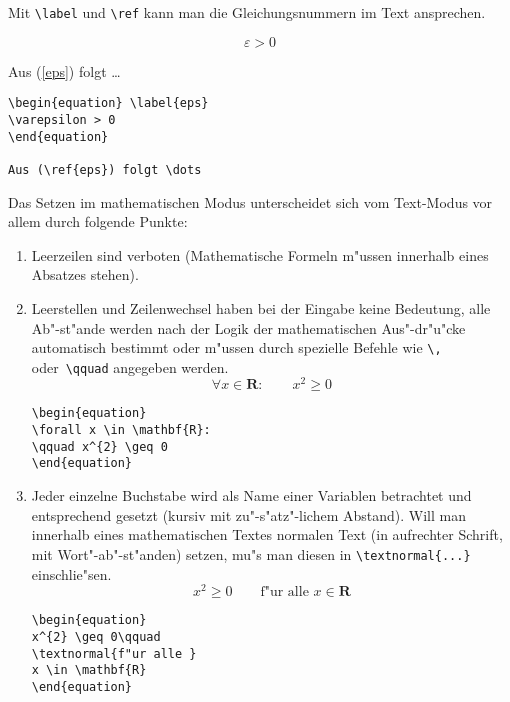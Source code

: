 Mit \verb|\label| und \verb|\ref| kann man die Gleichungsnummern
im Text ansprechen.

\exa
\begin{equation} \label{eps}
\varepsilon > 0
\end{equation}
 
Aus (\ref{eps}) folgt \dots
\exb
\begin{verbatim}
\begin{equation} \label{eps}
\varepsilon > 0
\end{equation}
 
Aus (\ref{eps}) folgt \dots
\end{verbatim}
\exc
 
 
 
Das Setzen im mathematischen Modus unterscheidet sich vom
Text-Modus vor allem durch folgende Punkte:
\begin{enumerate}
\item Leerzeilen sind verboten (Mathematische Formeln m"ussen
  innerhalb eines Absatzes stehen).

\item Leerstellen und Zeilenwechsel haben bei der Eingabe keine
  Bedeutung, alle Ab"-st"ande werden nach der Logik der
  mathematischen Aus"-dr"u"cke automatisch bestimmt oder m"ussen
  durch spezielle Befehle wie \verb|\,| oder~\verb|\qquad|
  angegeben werden.
\exa
\begin{equation}
\forall x \in \mathbf{R}:
\qquad x^{2} \geq 0
\end{equation}
\exb
\begin{verbatim}
\begin{equation}
\forall x \in \mathbf{R}:
\qquad x^{2} \geq 0
\end{equation}
\end{verbatim}
\exc
 
\item Jeder einzelne Buchstabe wird als Name einer Variablen
  betrachtet und entsprechend gesetzt (kursiv mit
  zu"-s"atz"-lichem Abstand).  Will man innerhalb eines
  mathematischen Textes normalen Text (in aufrechter Schrift, mit
  Wort"-ab"-st"anden) setzen, mu"s man diesen in
  \verb|\textnormal{...}| einschlie"sen.
\exa
\begin{equation}
x^{2} \geq 0\qquad
\textrm{f"ur alle }
x \in \mathbf{R}
\end{equation}
\exb
\begin{verbatim}
\begin{equation}
x^{2} \geq 0\qquad
\textnormal{f"ur alle }
x \in \mathbf{R}
\end{equation}
\end{verbatim}
\exc
 
 
\end{enumerate}
 
